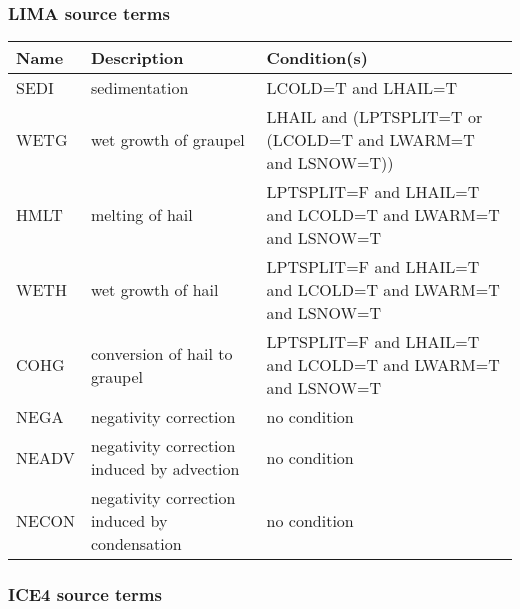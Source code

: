 \subsubsection{LIMA source terms}

\begin{longtable} {|p{}|p{}|p{}|}
\hline
Name & Description & Condition(s) \\
\hline \hline
\endhead
SEDI   & sedimentation                                 & LCOLD=T and LHAIL=T \\\hline
WETG   & wet growth of graupel                         & LHAIL and (LPTSPLIT=T or (LCOLD=T and LWARM=T and LSNOW=T)) \\\hline
HMLT   & melting of hail                               & LPTSPLIT=F and LHAIL=T and LCOLD=T and LWARM=T and LSNOW=T \\\hline
WETH   & wet growth of hail                            & LPTSPLIT=F and LHAIL=T and LCOLD=T and LWARM=T and LSNOW=T \\\hline
COHG   & conversion of hail to graupel                 & LPTSPLIT=F and LHAIL=T and LCOLD=T and LWARM=T and LSNOW=T \\\hline
NEGA   & negativity correction                         & no condition \\\hline
NEADV  & negativity correction induced by advection    & no condition \\\hline
NECON  & negativity correction induced by condensation & no condition \\\hline
\end{longtable}

\subsubsection{ICE4 source terms}

